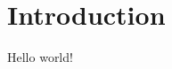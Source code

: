 \documentclass[a4paper, 12pt]{article}
\begin{document}
\section{Introduction}
Hello world!
\end{document}
